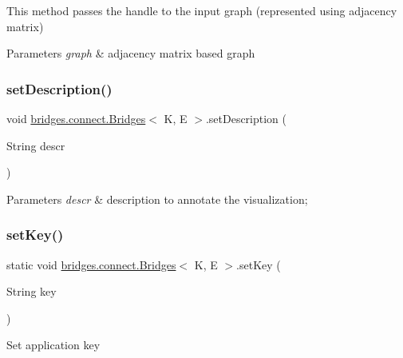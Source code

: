 This method passes the handle to the input graph (represented using adjacency matrix)


\begin{DoxyParams}{Parameters}
{\em graph} & adjacency matrix based graph \\
\hline
\end{DoxyParams}
\hypertarget{classbridges_1_1connect_1_1_bridges_a161206b37c2acdf435f4444679616eec}{}\label{classbridges_1_1connect_1_1_bridges_a161206b37c2acdf435f4444679616eec} 
\subsubsection{\texorpdfstring{set\+Description()}{setDescription()}}
{\footnotesize\ttfamily void \hyperlink{classbridges_1_1connect_1_1_bridges}{bridges.\+connect.\+Bridges}$<$ K, E $>$.set\+Description (\begin{DoxyParamCaption}\item[{String}]{descr }\end{DoxyParamCaption})}


\begin{DoxyParams}{Parameters}
{\em descr} & description to annotate the visualization; \\
\hline
\end{DoxyParams}
\hypertarget{classbridges_1_1connect_1_1_bridges_a484992ce3fce273ca2caa215a4488e3c}{}\label{classbridges_1_1connect_1_1_bridges_a484992ce3fce273ca2caa215a4488e3c} 
\subsubsection{\texorpdfstring{set\+Key()}{setKey()}}
{\footnotesize\ttfamily static void \hyperlink{classbridges_1_1connect_1_1_bridges}{bridges.\+connect.\+Bridges}$<$ K, E $>$.set\+Key (\begin{DoxyParamCaption}\item[{String}]{key }\end{DoxyParamCaption})\hspace{0.3cm}{\ttfamily [static]}}

Set application key


